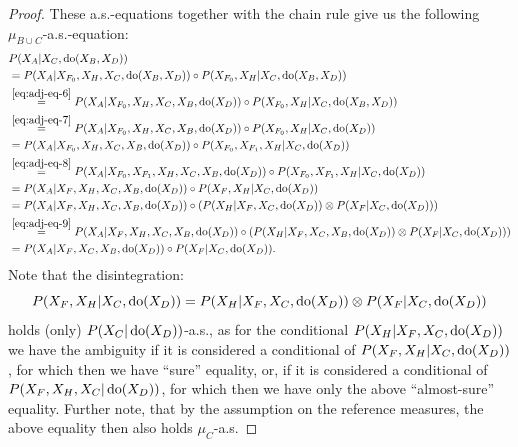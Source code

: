 \begin{Thm}
\begin{proof}
These a.s.-equations together with the chain rule give us the following
$\mu_{B \cup C}$-a.s.-equation:
\begin{align*}
 & P(X_A|X_C,\operatorname{do}(X_B,X_D)) \\
 &= P(X_A|X_{F_0},X_H,X_C,\operatorname{do}(X_B,X_D)) \circ P(X_{F_0},X_H|X_C,\operatorname{do}(X_B,X_D))\\
 &\stackrel{\ref{eq:adj-eq-6}}{=}
 P(X_A|X_{F_0},X_H,X_C,X_B,\operatorname{do}(X_D))\circ P(X_{F_0},X_H|X_C,\operatorname{do}(X_B,X_D)) \\
 &\stackrel{\ref{eq:adj-eq-7}}{=}
 P(X_A|X_{F_0},X_H,X_C,X_B,\operatorname{do}(X_D))\circ P(X_{F_0},X_H|X_C,\operatorname{do}(X_D)) \\
 &\stackrel{}{=}
 P(X_A|X_{F_0},X_H,X_C,X_B,\operatorname{do}(X_D))\circ P(X_{F_0},X_{F_1},X_H|X_C,\operatorname{do}(X_D)) \\
 & \stackrel{\ref{eq:adj-eq-8}}{=}
 P(X_A|X_{F_0},X_{F_1},X_H,X_C,X_B,\operatorname{do}(X_D))\circ P(X_{F_0},X_{F_1},X_H|X_C,\operatorname{do}(X_D)) \\
  & =
 P(X_A|X_F,X_H,X_C,X_B,\operatorname{do}(X_D))\circ P(X_F,X_H|X_C,\operatorname{do}(X_D)) \\
 & \stackrel{}{=}
  P(X_A|X_F,X_H,X_C,X_B,\operatorname{do}(X_D))\circ \left ( P(X_H|X_F,X_C,\operatorname{do}(X_D)) \otimes P(X_F|X_C,\operatorname{do}(X_D)) \right ) \\
  & \stackrel{\ref{eq:adj-eq-9}}{=}
 P(X_A|X_F,X_H,X_C,X_B,\operatorname{do}(X_D))\circ \left ( P(X_H|X_F,X_C,X_B,\operatorname{do}(X_D)) \otimes P(X_F|X_C,\operatorname{do}(X_D))  \right ) \\
   & \stackrel{}{=}
 P(X_A|X_F,X_C,X_B,\operatorname{do}(X_D))\circ  P(X_F|X_C,\operatorname{do}(X_D)).
    \end{align*}
Note that the disintegration: 
    \[ P(X_F,X_H|X_C,\operatorname{do}(X_D)) = P(X_H|X_F,X_C,\operatorname{do}(X_D)) \otimes P(X_F|X_C,\operatorname{do}(X_D)) \]
    holds (only) $P(X_C|\operatorname{do}(X_D))$-a.s., as for the conditional $P(X_H|X_F,X_C,\operatorname{do}(X_D))$ we have the ambiguity if it is considered a conditional of $P(X_F,X_H|X_C,\operatorname{do}(X_D))$, for which then we have ``sure'' equality, or, if it is considered a conditional of $P(X_F,X_H,X_C|\operatorname{do}(X_D))$, for which then we have only the above ``almost-sure'' equality.
Further note, that by the assumption on the reference measures, the above equality then also holds $\mu_{C}$-a.s.
\end{proof}
\end{Thm}

